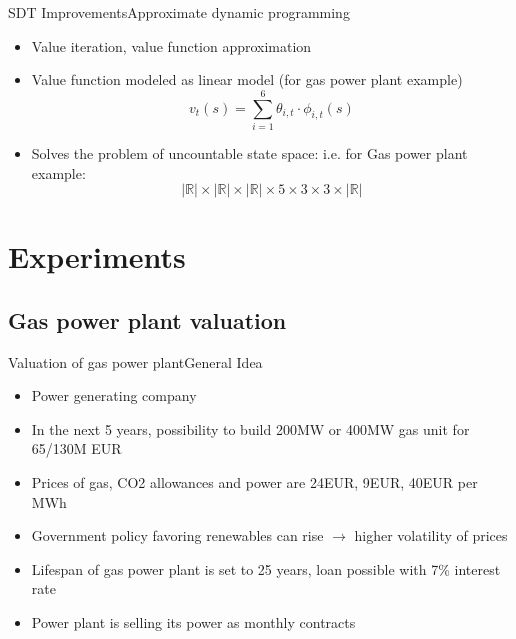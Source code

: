 \documentclass[us]{beamer}
\begin{document}
\begin{frame}{SDT Improvements}{Approximate dynamic programming}
		\begin{itemize}
			\item{Value iteration, value function approximation}
			\item{Value function modeled as linear model (for gas power plant example)}
			\begin{equation}
				v_t(s) = \sum_{i=1}^{6} \theta_{i,t} \cdot \phi_{i,t}(s)
			\end{equation}
			\item{Solves the problem of uncountable state space: i.e. for Gas power plant example:}
			\begin{equation}
				|\mathbb{R}| \times |\mathbb{R}| \times |\mathbb{R}| \times 5\times 3 \times 3 \times |\mathbb{R}|
			\end{equation}
		\end{itemize}
\end{frame}

\section{Experiments}


\subsection{Gas power plant valuation}
	
	
	\begin{frame}{Valuation of gas power plant}{General Idea}
	\begin{itemize}
		\item {Power generating company}
		\item {In the next 5 years, possibility to build 200MW or 400MW gas unit for 65/130M EUR}
		\item {Prices of gas, CO2 allowances and power are 24EUR, 9EUR, 40EUR per MWh}
		\item {Government policy favoring renewables can rise $\rightarrow$ higher volatility of prices}
		\item {Lifespan of gas power plant is set to 25 years, loan possible with 7\% interest rate}
		\item {Power plant is selling its power as monthly contracts}		
	\end{itemize}
	\end{frame}
\end{document}
